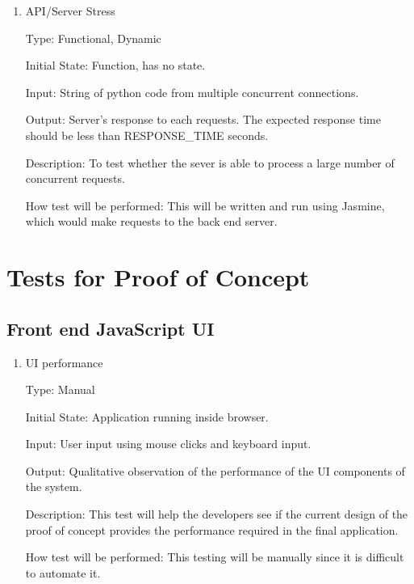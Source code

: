\documentclass[12pt, titlepage]{article}
\begin{document}
    \begin{enumerate}

    \item{API/Server Stress\\}

    Type: Functional, Dynamic

    Initial State: Function, has no state.

    Input: String of python code from multiple concurrent connections.

    Output: Server's response to each requests. The expected response time
    should be less than RESPONSE\_TIME seconds.

    Description: To test whether the sever is able to process a large number of
        concurrent requests.

    How test will be performed: This will be written and run using Jasmine,
        which would make requests to the back end server.

    \end{enumerate}

\section{Tests for Proof of Concept}

  \subsection{Front end JavaScript UI}
      
    \begin{enumerate}
              
    \item{UI performance\\}

    Type: Manual

    Initial State: Application running inside browser.

    Input: User input using mouse clicks and keyboard input.

    Output: Qualitative observation of the performance of the UI components of the
    system.
              
    Description: This test will help the developers see if the current design of
    the proof of concept provides the performance required in the final
    application.
              
    How test will be performed: This testing will be manually since it is difficult
    to automate it.

    \end{enumerate}
\end{document}
